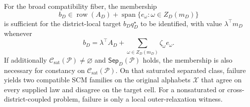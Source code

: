 For the broad compatibility fiber, the membership
\[
b_D\in\operatorname{row}(A_D)+\operatorname{span}\{e_\omega:\omega\in Z_D(m_D)\}
\]
is sufficient for the district-local target \(b_Dq_D^\star\) to be identified, with value \(\lambda^\top m_D\) whenever
\[
b_D=\lambda^\top A_D+\sum_{\omega\in Z_D(m_D)}\zeta_\omega e_\omega.
\]
If additionally \(\mathcal C_{\mathrm{sat}}(\mathcal P)\ne\varnothing\) and \(\mathsf{Sep}_D(\mathcal P)\) holds, the membership is also necessary for constancy on \(\mathcal C_{\mathrm{sat}}(\mathcal P)\).  On that saturated separated class, failure yields two compatible SCM families on the original alphabets \(\mathcal X\) that agree on every supplied law and disagree on the target cell.  For a nonsaturated or cross-district-coupled problem, failure is only a local outer-relaxation witness.